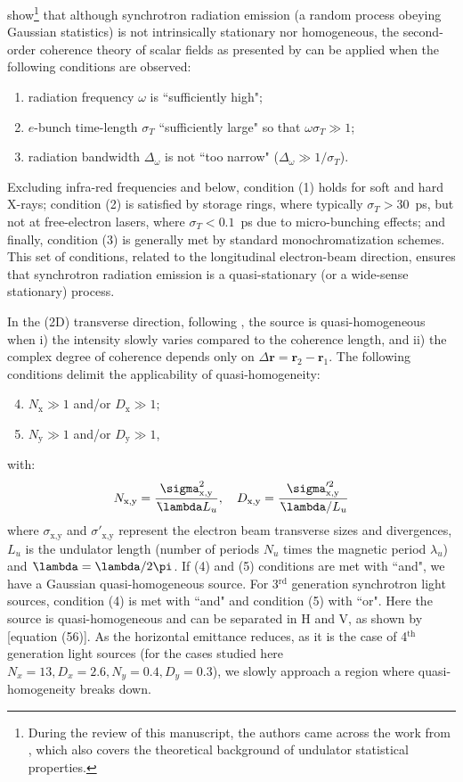 \documentclass{iucr}
\newcommand{\lambdabar}{{\mkern0.75mu\mathchar '26\mkern -8.2mu\lambda}}
\begin{document}
 show\footnote{During the review of this manuscript, the authors came across the work from  , which also covers the theoretical background of undulator statistical properties.} that although synchrotron radiation emission (a random process obeying Gaussian statistics) is not intrinsically stationary nor homogeneous, the second-order coherence theory of scalar fields as presented by  can be applied when the following conditions are observed:
\begin{enumerate}%
\item radiation frequency $\omega$ is ``sufficiently high";
\item $e$-bunch time-length $\sigma_{T}$ ``sufficiently large" so that $\omega\sigma_{T}\gg1$;
\item radiation bandwidth $\Delta_\omega$ is not ``too narrow" ($\Delta_\omega\gg1\big/\sigma_{T}$).
\end{enumerate}
Excluding infra-red frequencies and below, condition (1) holds for soft and hard X-rays; condition (2) is satisfied by storage rings, where typically $\sigma_{T}>30$~ps, but not at free-electron lasers, where $\sigma_{T}<0.1$~ps due to micro-bunching effects; and finally, condition (3) is generally met by standard monochromatization schemes. This set of conditions, related to the longitudinal electron-beam direction, ensures that synchrotron radiation emission is a quasi-stationary (or a wide-sense stationary) process. 

In the (2D) transverse direction, following \cite{geloni2008}, the source is quasi-homogeneous  when i) the intensity slowly varies compared to the coherence length, and ii) the complex degree of coherence depends only on $\Delta\textbf{r}=\textbf{r}_2-\textbf{r}_1$. The following conditions delimit the applicability of quasi-homogeneity: 
\begin{enumerate}%
\setcounter{enumi}{3}
\item $N_\text{x}\gg1$ and/or $D_\text{x}\gg1$;
\item $N_\text{y}\gg1$ and/or $D_\text{y}\gg1$,
\end{enumerate}
with:
\begin{equation}
    N_\text{x,y}=\frac{\sigma^2_\text{x,y}}{\lambdabar L_u}, \quad D_\text{x,y}=\frac{\sigma'^2_\text{x,y}}{\lambdabar/L_u}
\end{equation}
where $\sigma_\text{x,y}$ and $\sigma'_\text{x,y}$ represent the electron beam transverse sizes and divergences, $L_u$ is the undulator length (number of periods $N_u$ times the magnetic period $\lambda_u$) and $\lambdabar=\lambda/2\pi$.
If (4) and (5) conditions are met with ``and", we have a Gaussian quasi-homogeneous source.  For 3$^{\text{rd}}$ generation synchrotron light sources, condition (4) is met with ``and" and condition (5) with ``or". Here the source is quasi-homogeneous and can be separated in H and V, as shown by  [equation (56)]. 
As the horizontal emittance reduces, as it is the case of 4$^{\text{th}}$ generation light sources (for the cases studied here $N_x=13, D_x=2.6, N_y=0.4, D_y=0.3$), we slowly approach a region where quasi-homogeneity breaks down.
\end{document}
